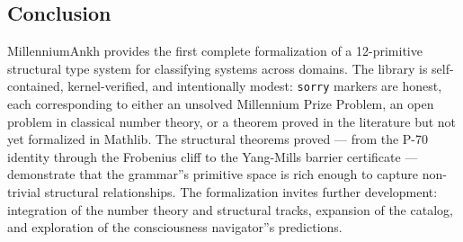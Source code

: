 \documentclass[12pt,a4paper]{article}
\begin{document}
\subsection{Conclusion}

MillenniumAnkh provides the first complete formalization of a 12-primitive structural type system for classifying systems across domains. The library is self-contained, kernel-verified, and intentionally modest: \texttt{sorry} markers are honest, each corresponding to either an unsolved Millennium Prize Problem, an open problem in classical number theory, or a theorem proved in the literature but not yet formalized in Mathlib. The structural theorems proved --- from the P-70 identity through the Frobenius cliff to the Yang-Mills barrier certificate --- demonstrate that the grammar''s primitive space is rich enough to capture non-trivial structural relationships. The formalization invites further development: integration of the number theory and structural tracks, expansion of the catalog, and exploration of the consciousness navigator''s predictions.
\end{document}

